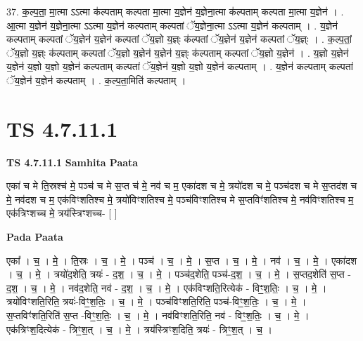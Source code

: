 \documentclass[17pt]{extarticle}
\begin{document}
37. क॒ल्प॒ता॒ मा॒त्मा ऽऽत्मा क॑ल्पताम् कल्पता मा॒त्मा य॒ज्ञेन॑ य॒ज्ञेना॒त्मा क॑ल्पताम् कल्पता मा॒त्मा य॒ज्ञेन॑ । . आ॒त्मा य॒ज्ञेन॑ य॒ज्ञेना॒त्मा ऽऽत्मा य॒ज्ञेन॑ कल्पताम् कल्पतां ॅय॒ज्ञेना॒त्मा ऽऽत्मा य॒ज्ञेन॑ कल्पताम् । . य॒ज्ञेन॑ कल्पताम् कल्पतां ॅय॒ज्ञेन॑ य॒ज्ञेन॑ कल्पतां ॅय॒ज्ञो य॒ज्ञ्ः क॑ल्पतां ॅय॒ज्ञेन॑ य॒ज्ञेन॑ कल्पतां ॅय॒ज्ञ्ः । . क॒ल्प॒तां॒ ॅय॒ज्ञो य॒ज्ञ्ः क॑ल्पताम् कल्पतां ॅय॒ज्ञो य॒ज्ञेन॑ य॒ज्ञेन॑ य॒ज्ञ्ः क॑ल्पताम् कल्पतां ॅय॒ज्ञो य॒ज्ञेन॑ । . य॒ज्ञो य॒ज्ञेन॑ य॒ज्ञेन॑ य॒ज्ञो य॒ज्ञो य॒ज्ञेन॑ कल्पताम् कल्पतां ॅय॒ज्ञेन॑ य॒ज्ञो य॒ज्ञो य॒ज्ञेन॑ कल्पताम् । . य॒ज्ञेन॑ कल्पताम् कल्पतां ॅय॒ज्ञेन॑ य॒ज्ञेन॑ कल्पताम् । . क॒ल्प॒ता॒मिति॑ कल्पताम् । \newline
\pagebreak
{}

\section{ TS 4.7.11.1 }

\textbf{TS 4.7.11.1 } \newline
\textbf{Samhita Paata} \newline

एका॑ च मे ति॒स्रश्च॑ मे॒ पञ्च॑ च मे स॒प्त च॑ मे॒ नव॑ च म॒ एका॑दश च मे॒ त्रयो॑दश च मे॒ पञ्च॑दश च मे स॒प्तद॑श च मे॒ नव॑दश च म॒ एक॑विꣳशतिश्च मे॒ त्रयो॑विꣳशतिश्च मे॒ पञ्च॑विꣳशतिश्च मे स॒प्तविꣳ॑शतिश्च मे॒ नव॑विꣳशतिश्च म॒ एक॑त्रिꣳशच्च मे॒ त्रय॑स्त्रिꣳशच्च- [  ] \newline

\textbf{Pada Paata} \newline

एका᳚ । च॒ । मे॒ । ति॒स्रः । च॒ । मे॒ । पञ्च॑ । च॒ । मे॒ । स॒प्त । च॒ । मे॒ । नव॑ । च॒ । मे॒ । एका॑दश । च॒ । मे॒ । त्रयो॑द॒शेति॒ त्रयः॑ - द॒श॒ । च॒ । मे॒ । पञ्च॑द॒शेति॒ पञ्च॑-द॒श॒ । च॒ । मे॒ । स॒प्तद॒शेति॑ स॒प्त - द॒श॒ । च॒ । मे॒ । नव॑द॒शेति॒ नव॑ - द॒श॒ । च॒ । मे॒ । एक॑विꣳशति॒रित्येक॑ - विꣳ॒॒श॒तिः॒ । च॒ । मे॒ । त्रयो॑विꣳशति॒रिति॒ त्रयः॑-विꣳ॒॒श॒तिः॒ । च॒ । मे॒ । पञ्च॑विꣳशति॒रिति॒ पञ्च॑-विꣳ॒॒श॒तिः॒ । च॒ । मे॒ । स॒प्तविꣳ॑शति॒रिति॑ स॒प्त -विꣳ॒॒श॒तिः॒ । च॒ । मे॒ । नव॑विꣳशति॒रिति॒ नव॑ - विꣳ॒॒श॒तिः॒ । च॒ । मे॒ । एक॑त्रिꣳश॒दित्येक॑ - त्रिꣳ॒॒श॒त् । च॒ । मे॒ । त्रय॑स्त्रिꣳश॒दिति॒ त्रयः॑ - त्रिꣳ॒॒श॒त् । च॒ ।  \newline
\end{document}
